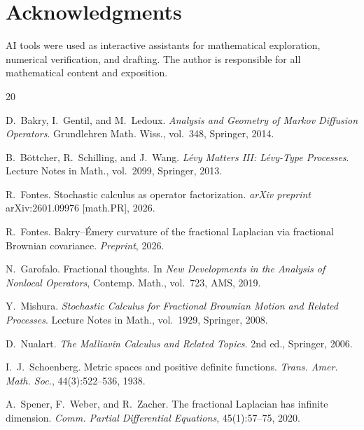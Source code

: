 \documentclass[11pt,a4paper]{article}
\theoremstyle{plain}
\theoremstyle{definition}
\theoremstyle{remark}
\begin{document}
\section*{Acknowledgments}
AI tools were used as interactive assistants for mathematical
exploration, numerical verification, and drafting. The author
is responsible for all mathematical content and exposition.


\begin{thebibliography}{20}

D.~Bakry, I.~Gentil, and M.~Ledoux.
\newblock \emph{Analysis and Geometry of Markov Diffusion Operators}.
\newblock Grundlehren Math. Wiss., vol.~348, Springer, 2014.

B.~B\"ottcher, R.~Schilling, and J.~Wang.
\newblock \emph{L\'evy Matters III: L\'evy-Type Processes}.
\newblock Lecture Notes in Math., vol.~2099, Springer, 2013.

R.~Fontes.
\newblock Stochastic calculus as operator factorization.
\newblock \emph{arXiv preprint} arXiv:2601.09976 [math.PR], 2026.

R.~Fontes.
\newblock Bakry--\'Emery curvature of the fractional Laplacian
  via fractional Brownian covariance.
\newblock \emph{Preprint}, 2026.

N.~Garofalo.
\newblock Fractional thoughts.
\newblock In \emph{New Developments in the Analysis of Nonlocal Operators},
  Contemp. Math., vol.~723, AMS, 2019.

Y.~Mishura.
\newblock \emph{Stochastic Calculus for Fractional Brownian Motion
  and Related Processes}.
\newblock Lecture Notes in Math., vol.~1929, Springer, 2008.

D.~Nualart.
\newblock \emph{The Malliavin Calculus and Related Topics}.
\newblock 2nd ed., Springer, 2006.

I.~J.~Schoenberg.
\newblock Metric spaces and positive definite functions.
\newblock \emph{Trans. Amer. Math. Soc.}, 44(3):522--536, 1938.

A.~Spener, F.~Weber, and R.~Zacher.
\newblock The fractional {L}aplacian has infinite dimension.
\newblock \emph{Comm. Partial Differential Equations}, 45(1):57--75, 2020.

\end{thebibliography}
\end{document}
